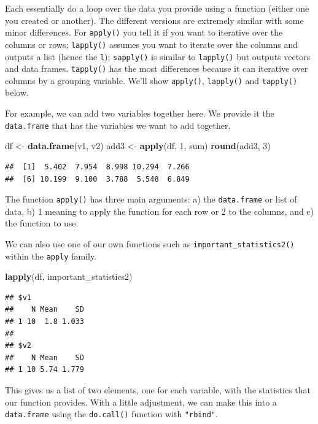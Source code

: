 \documentclass[]{tufte-book}
\newenvironment{Shaded}{}{}
\newcommand{\KeywordTok}[1]{\textcolor[rgb]{0.00,0.44,0.13}{\textbf{#1}}}
\newcommand{\DecValTok}[1]{\textcolor[rgb]{0.25,0.63,0.44}{#1}}
\newcommand{\StringTok}[1]{\textcolor[rgb]{0.25,0.44,0.63}{#1}}
\newcommand{\NormalTok}[1]{#1}
\theoremstyle{definition}
\theoremstyle{definition}
\theoremstyle{remark}
\begin{document}
Each essentially do a loop over the data you provide using a function
(either one you created or another). The different versions are
extremely similar with some minor differences. For \texttt{apply()} you
tell it if you want to iterative over the columns or rows;
\texttt{lapply()} assumes you want to iterate over the columns and
outputs a list (hence the \texttt{l}); \texttt{sapply()} is similar to
\texttt{lapply()} but outputs vectors and data frames. \texttt{tapply()}
has the most differences because it can iterative over columns by a
grouping variable. We'll show \texttt{apply()}, \texttt{lapply()} and
\texttt{tapply()} below.

For example, we can add two variables together here. We provide it the
\texttt{data.frame} that has the variables we want to add together.

\begin{Shaded}
\begin{Highlighting}[]
\NormalTok{df <-}\StringTok{ }\KeywordTok{data.frame}\NormalTok{(v1, v2)}
\NormalTok{add3 <-}\StringTok{ }\KeywordTok{apply}\NormalTok{(df, }\DecValTok{1}\NormalTok{, sum)}
\KeywordTok{round}\NormalTok{(add3, }\DecValTok{3}\NormalTok{)}
\end{Highlighting}
\end{Shaded}

\begin{verbatim}
##  [1]  5.402  7.954  8.998 10.294  7.266
##  [6] 10.199  9.100  3.788  5.548  6.849
\end{verbatim}

The function \texttt{apply()} has three main arguments: a) the
\texttt{data.frame} or list of data, b) 1 meaning to apply the function
for each row or 2 to the columns, and c) the function to use.

We can also use one of our own functions such as
\texttt{important\_statistics2()} within the \texttt{apply} family.

\begin{Shaded}
\begin{Highlighting}[]
\KeywordTok{lapply}\NormalTok{(df, important_statistics2)}
\end{Highlighting}
\end{Shaded}

\begin{verbatim}
## $v1
##    N Mean    SD
## 1 10  1.8 1.033
## 
## $v2
##    N Mean    SD
## 1 10 5.74 1.779
\end{verbatim}

This gives us a list of two elements, one for each variable, with the
statistics that our function provides. With a little adjustment, we can
make this into a \texttt{data.frame} using the \texttt{do.call()}
function with \texttt{"rbind"}.
\end{document}
